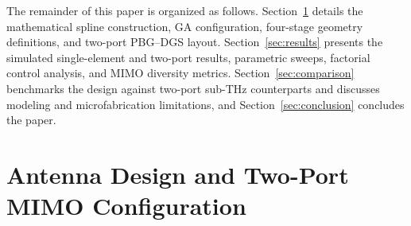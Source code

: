 \documentclass[referee,pdflatex,sn-mathphys-ay]{sn-jnl}
\begin{document}
The remainder of this paper is organized as follows. Section~\ref{sec:design_mimo} details the mathematical spline construction, GA configuration, four-stage geometry definitions, and two-port PBG--DGS layout. Section~\ref{sec:results} presents the simulated single-element and two-port results, parametric sweeps, factorial control analysis, and MIMO diversity metrics. Section~\ref{sec:comparison} benchmarks the design against two-port sub-THz counterparts and discusses modeling and microfabrication limitations, and Section~\ref{sec:conclusion} concludes the paper.




\section{Antenna Design and Two-Port MIMO Configuration}
\label{sec:design_mimo}
\end{document}
